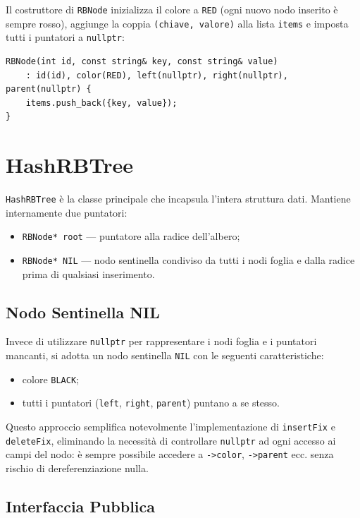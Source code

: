 Il costruttore di \texttt{RBNode} inizializza il colore a \texttt{RED} 
(ogni nuovo nodo inserito è sempre rosso), aggiunge la coppia 
\texttt{(chiave, valore)} alla lista \texttt{items} e imposta tutti i 
puntatori a \texttt{nullptr}:

\begin{lstlisting}
RBNode(int id, const string& key, const string& value)
    : id(id), color(RED), left(nullptr), right(nullptr), parent(nullptr) {
    items.push_back({key, value});
}
\end{lstlisting}

\section{HashRBTree}

\texttt{HashRBTree} è la classe principale che incapsula l'intera struttura dati. 
Mantiene internamente due puntatori:

\begin{itemize}
    \item \texttt{RBNode* root} --- puntatore alla radice dell'albero;
    \item \texttt{RBNode* NIL} --- nodo sentinella condiviso da tutti i nodi 
    foglia e dalla radice prima di qualsiasi inserimento.
\end{itemize}

\subsection{Nodo Sentinella NIL}

Invece di utilizzare \texttt{nullptr} per rappresentare i nodi foglia e i 
puntatori mancanti, si adotta un nodo sentinella \texttt{NIL} con le seguenti 
caratteristiche:

\begin{itemize}
    \item colore \texttt{BLACK};
    \item tutti i puntatori (\texttt{left}, \texttt{right}, \texttt{parent}) 
    puntano a se stesso.
\end{itemize}

Questo approccio semplifica notevolmente l'implementazione di \texttt{insertFix} 
e \texttt{deleteFix}, eliminando la necessità di controllare \texttt{nullptr} 
ad ogni accesso ai campi del nodo: è sempre possibile accedere a 
\texttt{->color}, \texttt{->parent} ecc. senza rischio di dereferenziazione nulla.

\subsection{Interfaccia Pubblica}

